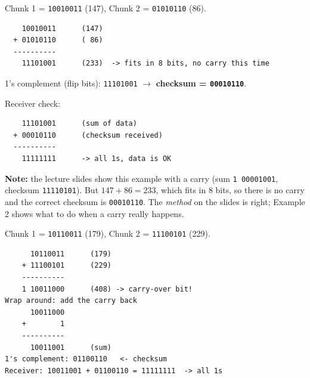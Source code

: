 \begin{workedex}
Chunk 1 = \texttt{10010011} (147), Chunk 2 = \texttt{01010110} (86).
\begin{lstlisting}
    10010011      (147)
  + 01010110      ( 86)
  ----------
    11101001      (233)  -> fits in 8 bits, no carry this time
\end{lstlisting}
1's complement (flip bits): \texttt{11101001} $\to$ \textbf{checksum = \texttt{00010110}}.

Receiver check:
\begin{lstlisting}
    11101001      (sum of data)
  + 00010110      (checksum received)
  ----------
    11111111      -> all 1s, data is OK
\end{lstlisting}
\textbf{Note:} the lecture slides show this example with a carry (sum \texttt{1 00001001}, checksum \texttt{11110101}). But $147+86 = 233$, which fits in 8 bits, so there is no carry and the correct checksum is \texttt{00010110}. The \emph{method} on the slides is right; Example 2 shows what to do when a carry really happens.
\end{workedex}

\begin{workedex}
Chunk 1 = \texttt{10110011} (179), Chunk 2 = \texttt{11100101} (229).
\begin{lstlisting}
      10110011      (179)
    + 11100101      (229)
    ----------
    1 10011000      (408) -> carry-over bit!
Wrap around: add the carry back
      10011000
    +        1
    ----------
      10011001      (sum)
1's complement: 01100110   <- checksum
Receiver: 10011001 + 01100110 = 11111111  -> all 1s
\end{lstlisting}
\end{workedex}

\begin{center}
\end{center}

